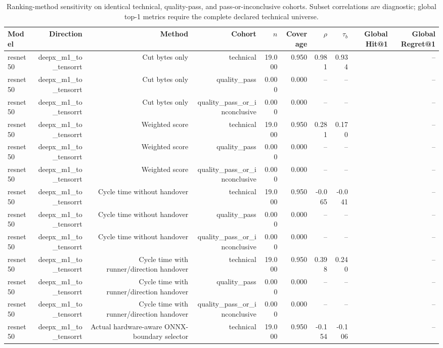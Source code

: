 \begin{table}[t]
\centering
\small
\caption{Ranking-method sensitivity on identical technical, quality-pass, and pass-or-inconclusive cohorts. Subset correlations are diagnostic; global top-1 metrics require the complete declared technical universe.}
\label{tab:ranking-method-cohort-sensitivity}
\begin{tabular}{lrrrrrrrrr}
\toprule
Model & Direction & Method & Cohort & $n$ & Coverage & $\rho$ & $\tau_b$ & Global Hit@1 & Global Regret@1 \\
\midrule
resnet50 & deepx\_m1\_to\_tensorrt & Cut bytes only & technical & 19.000 & 0.950 & 0.981 & 0.934 &  & -- \\
resnet50 & deepx\_m1\_to\_tensorrt & Cut bytes only & quality\_pass & 0.000 & 0.000 & -- & -- &  & -- \\
resnet50 & deepx\_m1\_to\_tensorrt & Cut bytes only & quality\_pass\_or\_inconclusive & 0.000 & 0.000 & -- & -- &  & -- \\
resnet50 & deepx\_m1\_to\_tensorrt & Weighted score & technical & 19.000 & 0.950 & 0.281 & 0.170 &  & -- \\
resnet50 & deepx\_m1\_to\_tensorrt & Weighted score & quality\_pass & 0.000 & 0.000 & -- & -- &  & -- \\
resnet50 & deepx\_m1\_to\_tensorrt & Weighted score & quality\_pass\_or\_inconclusive & 0.000 & 0.000 & -- & -- &  & -- \\
resnet50 & deepx\_m1\_to\_tensorrt & Cycle time without handover & technical & 19.000 & 0.950 & -0.065 & -0.041 &  & -- \\
resnet50 & deepx\_m1\_to\_tensorrt & Cycle time without handover & quality\_pass & 0.000 & 0.000 & -- & -- &  & -- \\
resnet50 & deepx\_m1\_to\_tensorrt & Cycle time without handover & quality\_pass\_or\_inconclusive & 0.000 & 0.000 & -- & -- &  & -- \\
resnet50 & deepx\_m1\_to\_tensorrt & Cycle time with runner/direction handover & technical & 19.000 & 0.950 & 0.398 & 0.240 &  & -- \\
resnet50 & deepx\_m1\_to\_tensorrt & Cycle time with runner/direction handover & quality\_pass & 0.000 & 0.000 & -- & -- &  & -- \\
resnet50 & deepx\_m1\_to\_tensorrt & Cycle time with runner/direction handover & quality\_pass\_or\_inconclusive & 0.000 & 0.000 & -- & -- &  & -- \\
resnet50 & deepx\_m1\_to\_tensorrt & Actual hardware-aware ONNX-boundary selector & technical & 19.000 & 0.950 & -0.154 & -0.106 &  & -- \\

\end{tabular}
\end{table}
